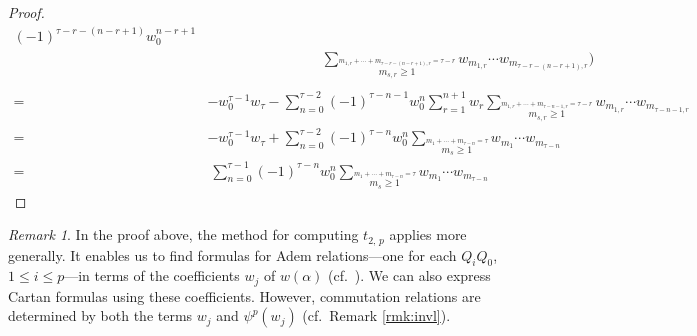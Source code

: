 \documentclass{gtpart}
\theoremstyle{definition}
\theoremstyle{remark}
\newtheorem{rmk}[thm]{Remark}
\newcommand{\A}{\alpha}
\newcommand{\T}{\tau}
\renewcommand{\=}{\approx}
\renewcommand{\-}{\sim}
\numberwithin{equation}{section}
\numberwithin{thm}{section}
\begin{document}
\begin{proof}
\begin{equation*}
\begin{split}
            (-1)^{\T - r - (n - r + 1)} w_0^{n - r + 1} \\
          & \qquad\qquad\qquad\qquad\, \sum_{\stackrel{\scriptstyle m_{1,r} 
            + \cdots + m_{\T - r - (n - r + 1),r} = \T - r}{m_{s,r} \geq 1}} 
            w_{m_{1,r}} \cdots w_{m_{\T - r - (n - r + 1),r}} \Bigg) \\\\
        = & -w_0^{\T - 1} w_\T - \sum_{n = 0}^{\T - 2} (-1)^{\T - n - 1} w_0^n 
            \sum_{r = 1}^{n + 1} w_r \sum_{\stackrel{\scriptstyle m_{1,r} 
            + \cdots + m_{\T - n - 1,r} = \T - r}{m_{s,r} \geq 1}} w_{m_{1,r}} 
            \cdots w_{m_{\T - n - 1,r}} \\
        = & -w_0^{\T - 1} w_\T + \sum_{n = 0}^{\T - 2} (-1)^{\T - n} w_0^n 
            \sum_{\stackrel{\scriptstyle m_1 + \cdots + m_{\T - n} = \T}{m_s 
            \geq 1}} w_{m_1} \cdots w_{m_{\T - n}} \\
        = & ~ \sum_{n = 0}^{\T - 1} (-1)^{\T - n} w_0^n 
            \sum_{\stackrel{\scriptstyle m_1 + \cdots + m_{\T - n} = \T}{m_s 
            \geq 1}} w_{m_1} \cdots w_{m_{\T - n}} 
  \end{split}
 \end{equation*}
\end{proof}

\begin{rmk}
 \label{rmk:Adem}
 In the proof above, the method for computing $t_{2,\,p}$ applies more 
 generally.  It enables us to find formulas for Adem relations---one for each 
 $Q_i Q_0$, $1 \leq i \leq p$---in terms of the coefficients $w_j$ of $w(\A)$ 
 (cf.~\cite[proof of Proposition 3.6\,(iv)]{p3}).  We can also express Cartan 
 formulas using these coefficients.  However, commutation relations are 
 determined by both the terms $w_j$ and $\psi^p(w_j)$ (cf.~Remark 
 \ref{rmk:invl}).  
\end{rmk}
\end{document}
